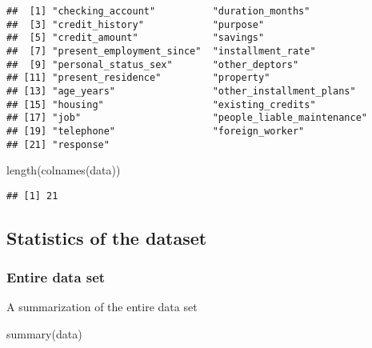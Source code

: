 \documentclass[
]{article}
\newenvironment{Shaded}{\begin{snugshade}}{\end{snugshade}}
\newcommand{\FunctionTok}[1]{\textcolor[rgb]{0.00,0.00,0.00}{#1}}
\newcommand{\NormalTok}[1]{#1}
\begin{document}
\begin{verbatim}
##  [1] "checking_account"          "duration_months"          
##  [3] "credit_history"            "purpose"                  
##  [5] "credit_amount"             "savings"                  
##  [7] "present_employment_since"  "installment_rate"         
##  [9] "personal_status_sex"       "other_deptors"            
## [11] "present_residence"         "property"                 
## [13] "age_years"                 "other_installment_plans"  
## [15] "housing"                   "existing_credits"         
## [17] "job"                       "people_liable_maintenance"
## [19] "telephone"                 "foreign_worker"           
## [21] "response"
\end{verbatim}

\begin{Shaded}
\begin{Highlighting}[]
\FunctionTok{length}\NormalTok{(}\FunctionTok{colnames}\NormalTok{(data))}
\end{Highlighting}
\end{Shaded}

\begin{verbatim}
## [1] 21
\end{verbatim}

\hypertarget{statistics-of-the-dataset}{%
\subsection{Statistics of the dataset}\label{statistics-of-the-dataset}}

\hypertarget{entire-data-set}{%
\subsubsection{Entire data set}\label{entire-data-set}}

A summarization of the entire data set

\begin{Shaded}
\begin{Highlighting}[]
\FunctionTok{summary}\NormalTok{(data)}
\end{Highlighting}
\end{Shaded}
\end{document}
